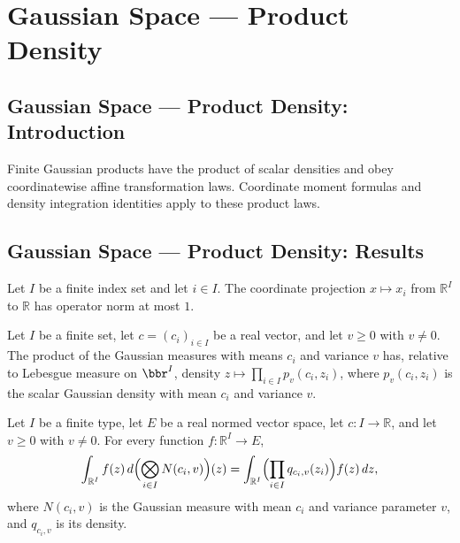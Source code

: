 \section{Gaussian Space --- Product Density}
\subsection*{Gaussian Space --- Product Density: Introduction}
Finite Gaussian products have the product of scalar densities and obey coordinatewise affine transformation laws. Coordinate moment formulas and density integration identities apply to these product laws.

\subsection*{Gaussian Space --- Product Density: Results}

\begin{lemma}
\leanok
{}
Let $I$ be a finite index set and let $i\in I$. The coordinate projection $x\mapsto x_i$
from $\mathbb R^I$ to $\mathbb R$ has operator norm at most $1$.
\end{lemma}

\begin{lemma}
\leanok
{}
Let $I$ be a finite set, let $c=(c_i)_{i\in I}$ be a real vector, and let $v\ge0$ with
$v\ne0$. The product of the Gaussian measures with means $c_i$ and variance $v$ has,
relative to Lebesgue measure on $\bbr^I$, density $z\mapsto\prod_{i\in I}p_v(c_i,z_i)$,
where $p_v(c_i,z_i)$ is the scalar Gaussian density with mean $c_i$ and variance $v$.
\end{lemma}

\begin{lemma}
\leanok
{}
Let $I$ be a finite type, let $E$ be a real normed vector space, let $c:I\to\mathbb R$,
and let $v\ge0$ with $v\ne0$. For every function $f:\mathbb R^I\to E$,
\[
\int_{\mathbb R^I}f(z)\,d\Bigl(\bigotimes_{i\in I}N(c_i,v)\Bigr)(z)
=\int_{\mathbb R^I}\Bigl(\prod_{i\in I}q_{c_i,v}(z_i)\Bigr)f(z)\,dz,
\]
where $N(c_i,v)$ is the Gaussian measure with mean $c_i$ and variance parameter $v$, and
$q_{c_i,v}$ is its density.
\end{lemma}

